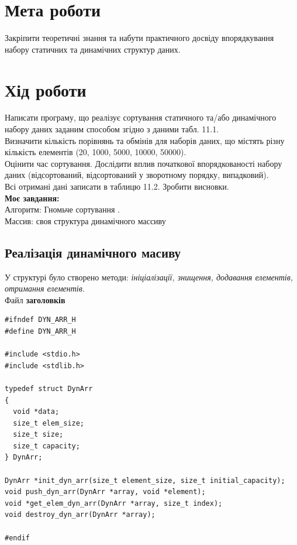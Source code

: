 \section{Мета роботи}
Закріпити теоретичні знання та набути практичного досвіду
впорядкування набору статичних та динамічних структур даних.

\section{Хід роботи}
Написати програму, що реалізує сортування статичного та/або
динамічного набору даних заданим способом згідно з даними табл. 11.1.\\

Визначити кількість порівнянь та обмінів для наборів даних, що
містять різну кількість елементів (20, 1000, 5000, 10000, 50000).\\

Оцінити час сортування. Дослідити вплив початкової впорядкованості
набору даних (відсортований, відсортований у зворотному порядку,
випадковий).\\

Всі отримані дані записати в таблицю 11.2. Зробити висновки.\\

\textbf{Моє завдання:} \\
Алгоритм: Гномьче сортування .\\
Массив: своя структура динамічного массиву\\

\clearpage
\subsection{Реалізація динамічного масиву}
У структурі було створено методи: \textit{ініціалізації, знищення, додавання елементів, отримання елементів}.\\

Файл \textbf{заголовків}
\begin{lstlisting}[style=customc]
#ifndef DYN_ARR_H
#define DYN_ARR_H

#include <stdio.h>
#include <stdlib.h>

typedef struct DynArr
{
  void *data;
  size_t elem_size;
  size_t size;
  size_t capacity;
} DynArr;

DynArr *init_dyn_arr(size_t element_size, size_t initial_capacity);
void push_dyn_arr(DynArr *array, void *element);
void *get_elem_dyn_arr(DynArr *array, size_t index);
void destroy_dyn_arr(DynArr *array);

#endif
\end{lstlisting}

